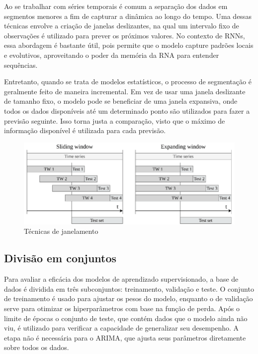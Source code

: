 Ao se trabalhar com séries temporais é comum a separação dos dados em segmentos menores
 a fim de capturar a dinâmica ao longo do tempo.
Uma dessas técnicas envolve a criação de janelas deslizantes, na qual um intervalo fixo de observações é utilizado para prever os próximos valores.
No contexto de RNNs, essa abordagem é bastante útil, pois permite que o modelo capture padrões locais e evolutivos, aproveitando o poder da memória da RNA para entender sequências.

Entretanto, quando se trata de modelos estatísticos, o processo de segmentação é geralmente feito de maneira incremental.
Em vez de usar uma janela deslizante de tamanho fixo, o modelo pode se beneficiar de uma janela expansiva, onde todos os dados disponíveis até um determinado ponto são utilizados para fazer a previsão seguinte.
Isso torna justa a comparação, visto que o máximo de informação disponível é utilizada para cada previsão.

\begin{figure}[!htb] \centering
    \caption{Técnicas de janelamento} \label{figura:window}
    \begin{varwidth}{\linewidth}
      \includegraphics[width=12cm]{figuras/window.png}
    \end{varwidth}
\end{figure}
  

\subsection{Divisão em conjuntos} \label{sec:divisao}
Para avaliar a eficácia dos modelos de aprendizado supervisionado, a base de dados é dividida em três subconjuntos: treinamento, validação e teste.
O conjunto de treinamento é usado para ajustar os pesos do modelo, enquanto o de validação serve para otimizar os hiperparâmetros com base na função de perda.
Após o limite de épocas o conjunto de teste, que contém dados que o modelo ainda não viu, é utilizado para verificar a capacidade de generalizar seu desempenho. A etapa não é necessária para o ARIMA, que ajusta seus parâmetros diretamente sobre todos os dados.

